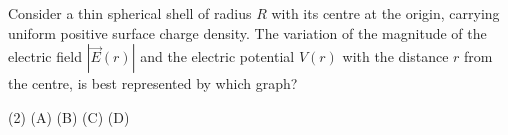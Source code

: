 
\item Consider a thin spherical shell of radius \( R \) with its centre at the origin, carrying uniform positive surface charge density. The variation of the magnitude of the electric field \( | \vec{E}(r) | \) and the electric potential \( V(r) \) with the distance \( r \) from the centre, is best represented by which graph?
    \begin{center}
        \hspace{1cm}

        \vspace{1cm} %

        \hspace{1cm}
    \end{center}
    \begin{tasks}(2)
        \task (A)
        \task (B)
        \task (C)
        \task (D)
    \end{tasks}
